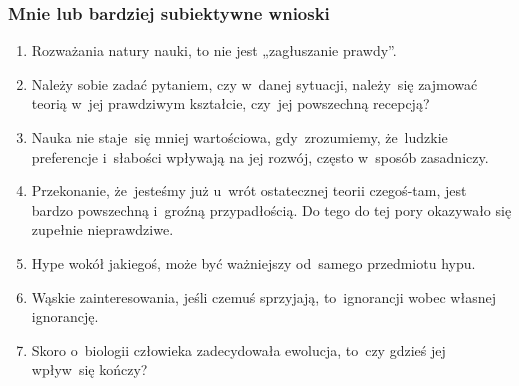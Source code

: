 \documentclass[10pt,t]{beamer}
\begin{document}
\begin{frame}
  \frametitle{Mnie lub bardziej subiektywne wnioski}


  \begin{enumerate}

  \item Rozważania natury nauki, to nie jest „zagłuszanie prawdy”.

  \item Należy sobie zadać pytaniem, czy w~danej sytuacji,
    należy~się zajmować teorią w~jej prawdziwym kształcie, czy~jej
    powszechną recepcją?

  \item Nauka nie staje~się mniej wartościowa, gdy~zrozumiemy,
    że~ludzkie preferencje i~słabości wpływają na jej rozwój, często
    w~sposób zasadniczy.

  \item Przekonanie, że~jesteśmy już u~wrót ostatecznej teorii
    czegoś-tam, jest bardzo powszechną i~groźną przypadłością. Do tego do
    tej pory okazywało się zupełnie nieprawdziwe.

  \item Hype wokół jakiegoś, może być ważniejszy od~samego przedmiotu
    hypu.

  \item Wąskie zainteresowania, jeśli czemuś sprzyjają,
    to~ignorancji wobec własnej ignorancję.

  \item Skoro o~biologii człowieka zadecydowała ewolucja, to~czy
    gdzieś jej wpływ~się kończy?

    \end{enumerate}

\end{frame}
\end{document}
